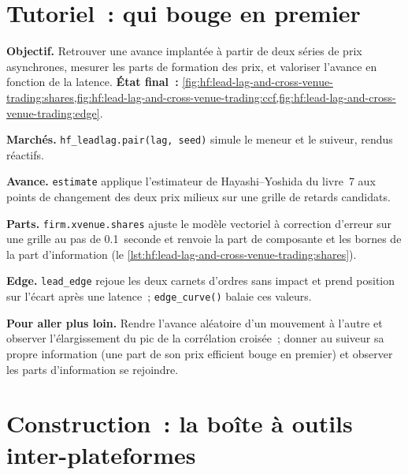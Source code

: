 \section{Tutoriel~: qui bouge en premier}\label{tut:hf:lead-lag-and-cross-venue-trading:tut}

\begin{tutorial}
\textbf{Objectif.} Retrouver une avance implantée à partir de deux séries de prix asynchrones, mesurer les parts de formation des prix, et valoriser l'avance en fonction de la
latence. \textbf{État final~:} \cref{fig:hf:lead-lag-and-cross-venue-trading:shares,fig:hf:lead-lag-and-cross-venue-trading:ccf,fig:hf:lead-lag-and-cross-venue-trading:edge}.
\begin{tutsteps}
\item \textbf{Marchés.} \texttt{hf\_leadlag.pair(lag, seed)} simule le meneur et le suiveur, rendus réactifs.
\item \textbf{Avance.} \texttt{estimate} applique l'estimateur de Hayashi--Yoshida du livre~7 aux points de changement des deux prix milieux sur une grille de retards candidats.
\item \textbf{Parts.} \texttt{firm.xvenue.shares} ajuste le modèle vectoriel à correction d'erreur sur une grille au pas de 0.1~seconde et renvoie la part de composante et les
bornes de la part d'information (le \cref{lst:hf:lead-lag-and-cross-venue-trading:shares}).
\label{lst:hf:lead-lag-and-cross-venue-trading:shares}
\item \textbf{Edge.} \texttt{lead\_edge} rejoue les deux carnets d'ordres sans impact et prend position sur l'écart après une latence~; \texttt{edge\_curve()} balaie ces valeurs.
\label{lst:hf:lead-lag-and-cross-venue-trading:edge}
\end{tutsteps}
\textbf{Pour aller plus loin.} Rendre l'avance aléatoire d'un mouvement à l'autre et observer l'élargissement du pic de la corrélation croisée~; donner au suiveur sa propre
information (une part de son prix efficient bouge en premier) et observer les parts d'information se rejoindre.
\end{tutorial}

\section{Construction~: la boîte à outils inter-plateformes}\label{bld:hf:lead-lag-and-cross-venue-trading:xvenue}

